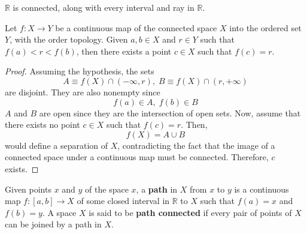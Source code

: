     \begin{corollary}
      $\mathbb{R}$ is connected, along with every interval and ray in $\mathbb{R}$. 
    \end{corollary}

    \begin{theorem}
      Let $f: X \longrightarrow Y$ be a continuous map of the connected space $X$ into the ordered set $Y$, with the order topology. Given $a, b \in X$ and $r \in Y$ such that $f(a)<r<f(b)$, then there exists a point $c \in X$ such that $f(c) = r$. 
    \end{theorem}
    \begin{proof}
      Assuming the hypothesis, the sets 
      \begin{equation}
        A \equiv f(X) \cap (-\infty, r), \; B \equiv f(X) \cap (r, +\infty)
      \end{equation}
      are disjoint. They are also nonempty since 
      \begin{equation}
        f(a) \in A, \; f(b) \in B
      \end{equation}
      $A$ and $B$ are open since they are the intersection of open sets. Now, assume that there exists no point $c \in X$ such that $f(c) = r$. Then, 
      \begin{equation}
        f(X) = A \cup B
      \end{equation}
      would define a separation of $X$, contradicting the fact that the image of a connected space under a continuous map must be connected. Therefore, $c$ exists. 
    \end{proof}

    \begin{definition}
      Given points $x$ and $y$ of the space $x$, a \textbf{path} in $X$ from $x$ to $y$ is a continuous map $f: [a,b] \longrightarrow X$ of some closed interval in $\mathbb{R}$ to $X$ such that $f(a) = x$ and $f(b)=y$. A space $X$ is said to be \textbf{path connected} if every pair of points of $X$ can be joined by a path in $X$. 
    \end{definition}

